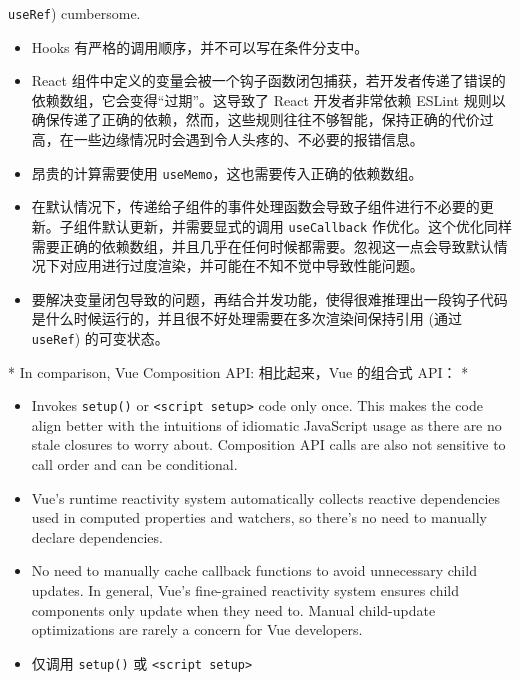 \begin{paracol}{2}
\begin{itemize}
  \texttt{useRef}) cumbersome.
\end{itemize}
\switchcolumn
\begin{itemize}
\item
  Hooks 有严格的调用顺序，并不可以写在条件分支中。
\item
  React
  组件中定义的变量会被一个钩子函数闭包捕获，若开发者传递了错误的依赖数组，它会变得``过期''。这导致了
  React 开发者非常依赖 ESLint
  规则以确保传递了正确的依赖，然而，这些规则往往不够智能，保持正确的代价过高，在一些边缘情况时会遇到令人头疼的、不必要的报错信息。
\item
  昂贵的计算需要使用 \texttt{useMemo}，这也需要传入正确的依赖数组。
\item
  在默认情况下，传递给子组件的事件处理函数会导致子组件进行不必要的更新。子组件默认更新，并需要显式的调用
  \texttt{useCallback}
  作优化。这个优化同样需要正确的依赖数组，并且几乎在任何时候都需要。忽视这一点会导致默认情况下对应用进行过度渲染，并可能在不知不觉中导致性能问题。
\item
  要解决变量闭包导致的问题，再结合并发功能，使得很难推理出一段钩子代码是什么时候运行的，并且很不好处理需要在多次渲染间保持引用
  (通过 \texttt{useRef}) 的可变状态。
\end{itemize}
\switchcolumn[0]*%
In comparison, Vue Composition API:
\switchcolumn
相比起来，Vue 的组合式 API：
\switchcolumn[0]*%
\begin{itemize}
\item
  Invokes \texttt{setup()} or
  \texttt{\textless{}script\ setup\textgreater{}} code only once. This
  makes the code align better with the intuitions of idiomatic
  JavaScript usage as there are no stale closures to worry about.
  Composition API calls are also not sensitive to call order and can be
  conditional.
\item
  Vue's runtime reactivity system automatically collects reactive
  dependencies used in computed properties and watchers, so there's no
  need to manually declare dependencies.
\item
  No need to manually cache callback functions to avoid unnecessary
  child updates. In general, Vue's fine-grained reactivity system
  ensures child components only update when they need to. Manual
  child-update optimizations are rarely a concern for Vue developers.
\end{itemize}
\switchcolumn
\begin{itemize}
\item
  仅调用 \texttt{setup()} 或
  \texttt{\textless{}script\ setup\textgreater{}}

\end{itemize}
\end{paracol}
